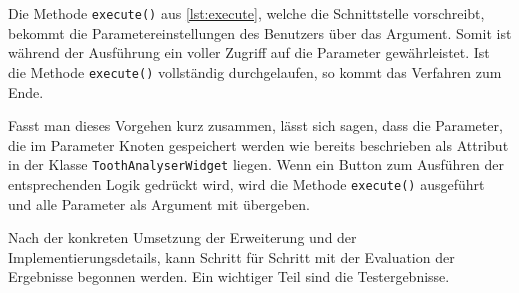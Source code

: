 Die Methode \texttt{execute()} aus \ref{lst:execute}, welche die Schnittstelle vorschreibt,
bekommt die Parametereinstellungen des Benutzers über das Argument. Somit ist während
der Ausführung ein voller Zugriff auf die Parameter gewährleistet. Ist die
Methode \texttt{execute()} vollständig durchgelaufen, so kommt das Verfahren zum
Ende.

Fasst man dieses Vorgehen kurz zusammen, lässt sich sagen, dass die Parameter, die
im Parameter Knoten gespeichert werden wie bereits beschrieben als Attribut in der
Klasse \texttt{ToothAnalyserWidget} liegen. Wenn ein Button zum Ausführen der entsprechenden
Logik gedrückt wird, wird die Methode \texttt{execute()} ausgeführt und alle Parameter
als Argument mit übergeben.

Nach der konkreten Umsetzung der Erweiterung und der Implementierungsdetails,
kann Schritt für Schritt mit der Evaluation der Ergebnisse begonnen werden. Ein wichtiger
Teil sind die Testergebnisse.
